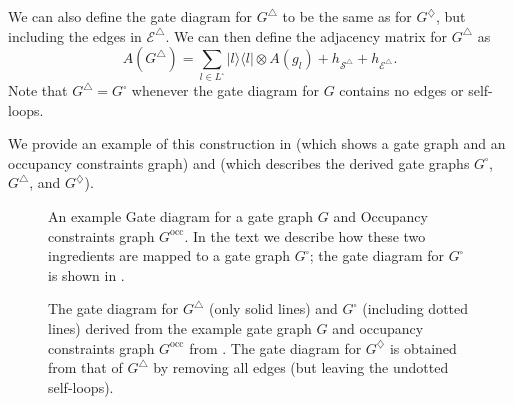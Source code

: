 \documentclass[../thesis-main/thesis-main]{subfiles}
\begin{document}
We can also define the gate diagram for $G^{\triangle}$ to be the same as for $G^{\diamondsuit}$, but including the edges in $\mathcal{E}^{\triangle}$.  We can then define the adjacency matrix for $G^{\triangle}$ as
\begin{equation}
  A(G^{\triangle})=\sum_{l\in L^{\square}}|l\rangle\langle l|\otimes A(g_{l})+h_{\mathcal{S}^{\triangle}}+h_{\mathcal{E}^{\triangle}}.\label{eq:A_g_triangle}
\end{equation}
Note that $G^{\triangle}=G^{\square}$ whenever the gate diagram for $G$ contains no edges or self-loops. 


We provide an example of this construction in  (which shows a gate graph and an occupancy constraints graph) and  (which describes the derived gate graphs $G^{\square}$, $G^{\triangle}$, and $G^{\diamondsuit}$).


\begin{figure}
\centering
{}
\hspace{4cm}
\caption[Example occupancy constraints]{An example  Gate diagram for a gate graph $G$ and  Occupancy constraints graph $G^{\text{occ}}$. In the text we describe how these two ingredients are mapped to a gate graph $G^{\square}$; the gate diagram for $G^{\square}$ is shown in .\label{fig:example_G_Gtilde}}
\end{figure}

\begin{figure}
  
\caption[$G^\square$ example]{The gate diagram for $G^{\triangle}$ (only solid lines) and $G^{\square}$ (including dotted lines) derived from the example gate graph $G$ and occupancy constraints graph $G^{\text{occ}}$ from . The gate diagram for $G^{\diamondsuit}$ is obtained from that of $G^{\triangle}$ by removing all edges (but leaving the undotted self-loops).\label{fig:big_example_G_square}}
\end{figure}


\end{document}
